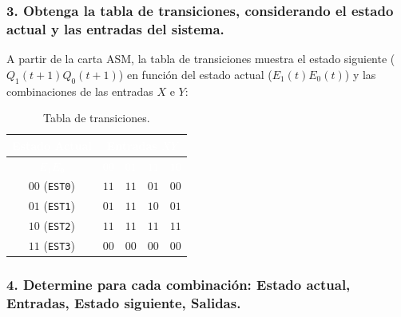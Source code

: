 \documentclass[12pt, letterpaper]{article}
\begin{document}
\subsubsection*{3. Obtenga la tabla de transiciones, considerando el estado actual y las entradas del sistema.}

\begin{tcolorbox}[colback=gray!20,colframe=LimeGreen!75!black]
    A partir de la carta ASM, la tabla de transiciones muestra el estado siguiente ($Q_1(t+1) Q_0(t+1)$) en función del estado actual ($E_1(t) E_0(t)$) y las combinaciones de las entradas $X$ e $Y$:

    \begin{table}[H]
    \renewcommand{\arraystretch}{1.2}
    \begin{center}
        \begin{tabular}{|c|c|c|c|c|}
        \hline
        \rowcolor{black!80}
        \textcolor{white}{\textbf{Estado Actual}} & \multicolumn{4}{c|}{\textcolor{white}{\textbf{Entradas $X Y$}}} \\
        \hline
        \cellcolor{black!80}\textcolor{white}{\textbf{$E_1 E_0$}} & \cellcolor{NavyBlue!80!black}\textcolor{white}{\textbf{$00$}} & \cellcolor{NavyBlue!80!black}\textcolor{white}{\textbf{$01$}} & \cellcolor{NavyBlue!80!black} \textcolor{white}{\textbf{$11$}} & \cellcolor{NavyBlue!80!black} \textcolor{white}{\textbf{$10$}} \\
        \hline
        $00$ (\texttt{EST0}) & $11$ & $11$ & $01$ & $00$ \\
        $01$ (\texttt{EST1}) & $01$ & $11$ & $10$ & $01$ \\
        $10$ (\texttt{EST2}) & $11$ & $11$ & $11$ & $11$ \\
        $11$ (\texttt{EST3}) & $00$ & $00$ & $00$ & $00$ \\
        \hline
        \end{tabular}
        \caption{Tabla de transiciones.}
        \label{tab:tabla_transiciones}
    \end{center}
    \end{table}
\end{tcolorbox}

\subsubsection*{4. Determine para cada combinación: Estado actual, Entradas, Estado siguiente, Salidas.}
\end{document}
